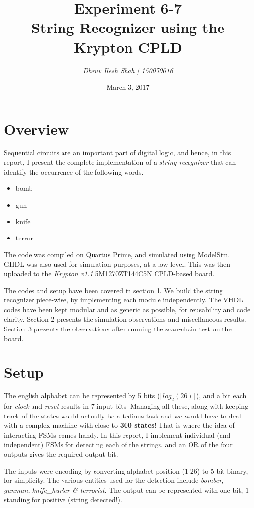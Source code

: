 \documentclass[a4paper, 11pt]{article}
\title{\bf Experiment 6-7\\\vspace*{2mm} String Recognizer using the Krypton CPLD}
\author{\it Dhruv Ilesh Shah | 150070016}
\date{March 3, 2017}
\begin{document}
\maketitle
\section*{Overview}
Sequential circuits are an important part of digital logic, and hence, in this report, I present the complete implementation of a \emph{string recognizer} that can identify the occurrence of the following words.
\begin{itemize}

	\item bomb
	\item gun
	\item knife
	\item terror
	
\end{itemize}

The code was compiled on Quartus Prime, and simulated using ModelSim. GHDL was also used for simulation purposes, at a low level. This was then uploaded to the {\em Krypton v1.1} 5M1270ZT144C5N CPLD-based board.

The codes and setup have been covered in section 1. We build the string recognizer piece-wise, by implementing each module independently. The VHDL codes have been kept modular and as generic as possible, for reusability and code clarity. Section 2 presents the simulation observations and miscellaneous results. Section 3 presents the observations after running the scan-chain test on the board.

\section{Setup}
The english alphabet can be represented by 5 bits ($\lceil log_2(26) \rceil$), and a bit each for \emph{clock} and \emph{reset} results in 7 input bits. Managing all these, along with keeping track of the states would actually be a tedious task and we would have to deal with a complex machine with close to {\bf 300 states}! That is where the idea of interacting FSMs comes handy. In this report, I implement individual (and independent) FSMs for detecting each of the strings, and an OR of the four outputs gives the required output bit. \par
The inputs were encoding by converting alphabet position (1-26) to 5-bit binary, for simplicity. The various entities used for the detection include \emph{bomber, gunman, knife\_hurler \& terrorist}. The output can be represented with one bit, $1$ standing for positive (string detected!).
\end{document}

